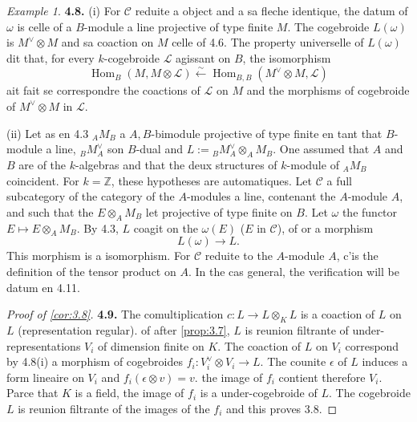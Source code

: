 \documentclass[12pt,a4paper]{article}
\theoremstyle{plain}
\theoremstyle{definition}
\theoremstyle{remark}
\newtheorem{example}[theorem]{Example}
\DeclareMathOperator{\Hom}{Hom}
\begin{document}
\begin{example}
\textbf{4.8.} (i) For $\mathcal{C}$ reduite a object and a sa fleche identique, the datum of $\omega$ is celle of a $B$-module a line projective of type finite $M$. The cogebroide $L(\omega)$ is $M^\vee \otimes M$ and sa coaction on $M$ celle of 4.6. The property universelle of $L(\omega)$ dit that, for every $k$-cogebroide $\mathcal{L}$ agissant on $B$, the isomorphism
\[
\Hom_B(M, M \otimes \mathcal{L}) \xleftarrow{\sim} \Hom_{B,B}(M^\vee \otimes M, \mathcal{L})
\]
ait fait se correspondre the coactions of $\mathcal{L}$ on $M$ and the morphisms of cogebroide of $M^\vee \otimes M$ in $\mathcal{L}$.

(ii) Let as en 4.3 ${}_A M_B$ a $A,B$-bimodule projective of type finite en tant that $B$-module a line, ${}_B M_A^\vee$ son $B$-dual and $L := {}_B M_A^\vee \otimes_A M_B$. One assumed that $A$ and $B$ are of the $k$-algebras and that the deux structures of $k$-module of ${}_A M_B$ coincident. For $k = \mathbb{Z}$, these hypotheses are automatiques. Let $\mathcal{C}$ a full subcategory of the category of the $A$-modules a line, contenant the $A$-module $A$, and such that the $E \otimes_A M_B$ let projective of type finite on $B$. Let $\omega$ the functor $E \mapsto E \otimes_A M_B$. By 4.3, $L$ coagit on the $\omega(E)$ ($E$ in $\mathcal{C}$), of or a morphism
\begin{equation}\label{eq:4.8.1}
L(\omega) \to L.
\end{equation}
This morphism is a isomorphism. For $\mathcal{C}$ reduite to the $A$-module $A$, c'is the definition of the tensor product on $A$. In the cas general, the verification will be datum en 4.11.
\end{example}

\begin{proof}[Proof of \ref{cor:3.8}]
\textbf{4.9.} The comultiplication $c : L \to L \otimes_K L$ is a coaction of $L$ on $L$ (representation regular). of after \ref{prop:3.7}, $L$ is reunion filtrante of under-representations $V_i$ of dimension finite on $K$. The coaction of $L$ on $V_i$ correspond by 4.8(i) a morphism of cogebroides $f_i : V_i^\vee \otimes V_i \to L$. The counite $\epsilon$ of $L$ induces a form lineaire on $V_i$ and $f_i(\epsilon \otimes v) = v$. the image of $f_i$ contient therefore $V_i$. Parce that $K$ is a field, the image of $f_i$ is a under-cogebroide of $L$. The cogebroide $L$ is reunion filtrante of the images of the $f_i$ and this proves 3.8.
\end{proof}
\end{document}
